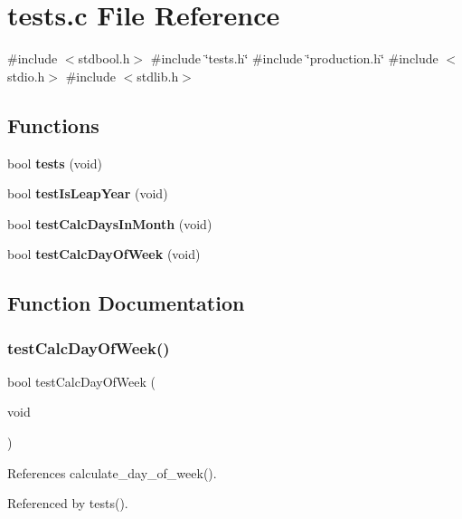 \section{tests.\+c File Reference}
\label{tests_8c}
{\ttfamily \#include $<$stdbool.\+h$>$}\newline
{\ttfamily \#include \char`\"{}tests.\+h\char`\"{}}\newline
{\ttfamily \#include \char`\"{}production.\+h\char`\"{}}\newline
{\ttfamily \#include $<$stdio.\+h$>$}\newline
{\ttfamily \#include $<$stdlib.\+h$>$}\newline
\subsection*{Functions}
\begin{DoxyCompactItemize}
\item 
bool \textbf{ tests} (void)
\item 
bool \textbf{ test\+Is\+Leap\+Year} (void)
\item 
bool \textbf{ test\+Calc\+Days\+In\+Month} (void)
\item 
bool \textbf{ test\+Calc\+Day\+Of\+Week} (void)
\end{DoxyCompactItemize}


\subsection{Function Documentation}
\mbox{\label{tests_8c_adaf10b63d8530290dba5512c538b63fb}} 
\subsubsection{test\+Calc\+Day\+Of\+Week()}
{\footnotesize\ttfamily bool test\+Calc\+Day\+Of\+Week (\begin{DoxyParamCaption}\item[{void}]{ }\end{DoxyParamCaption})}



References calculate\+\_\+day\+\_\+of\+\_\+week().



Referenced by tests().

\mbox{\label{tests_8c_a6f865121348bb48d247b872d1ce204db}} 
